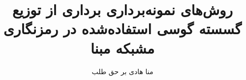 \documentclass[12pt,oneside]{book}
\title{ روش‌های نمونه‌برداری برداری از توزیع گسسته گوسی استفاده‌شده در رمزنگاری مشبکه مبنا }
\author{منا هادی بر حق طلب}
\begin{document}
\nocite{*}







\tableofcontents
\listoffigures











\clearpage




\end{document}
